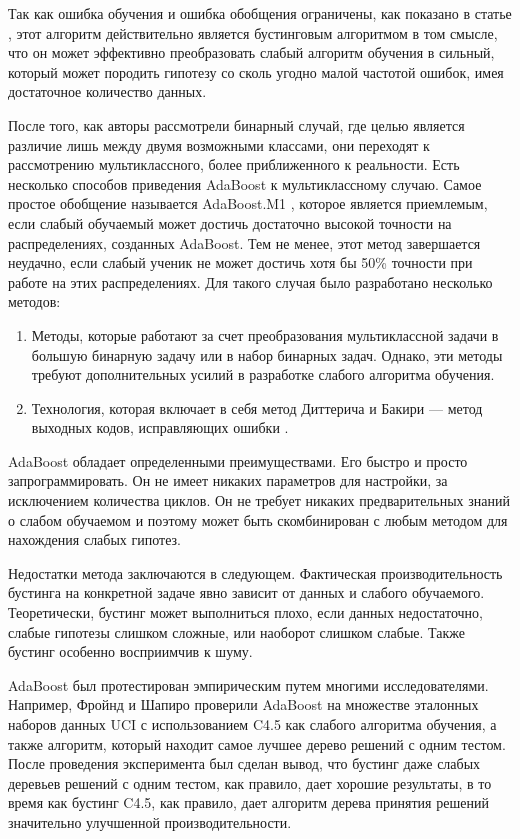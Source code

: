 \documentclass{article}
\begin{document}
\begin{articletext}
Так как ошибка обучения и ошибка обобщения ограничены, как показано в статье \cite{Freund 1999}, этот алгоритм действительно является бустинговым алгоритмом в том смысле, что он может эффективно преобразовать слабый алгоритм обучения в сильный, который может породить гипотезу со сколь угодно малой частотой ошибок, имея достаточное количество данных.

После того, как авторы рассмотрели бинарный случай, где целью является различие лишь между двумя возможными классами, они переходят к рассмотрению мультиклассного, более приближенного к реальности. Есть несколько способов приведения AdaBoost к мультиклассному случаю. Самое простое обобщение называется AdaBoost.M1 \cite{Freund 1997}, которое является приемлемым, если слабый обучаемый может достичь достаточно высокой точности на распределениях, созданных AdaBoost. Тем не менее, этот метод завершается неудачно, если слабый ученик не может достичь хотя бы 50\% точности при работе на этих  распределениях. Для такого случая было разработано несколько методов:

\begin{enumerate}
\item Методы, которые работают за счет преобразования мультиклассной задачи в большую бинарную задачу или в набор бинарных задач. Однако, эти методы требуют дополнительных усилий в разработке слабого алгоритма обучения.
\item Технология, которая включает в себя метод Диттерича и Бакири --- метод выходных кодов, исправляющих ошибки \cite{Schapire 1997}.
\end{enumerate}

AdaBoost обладает определенными преимуществами. Его быстро и просто запрограммировать. Он не имеет никаких параметров для настройки, за исключением количества циклов. Он не требует никаких предварительных знаний о слабом обучаемом и поэтому может быть скомбинирован с любым методом для нахождения слабых гипотез.

Недостатки метода заключаются в следующем. Фактическая производительность бустинга на конкретной задаче явно зависит от данных и слабого обучаемого. Теоретически, бустинг может выполниться плохо, если данных недостаточно, слабые гипотезы слишком сложные, или наоборот слишком слабые. Также бустинг особенно восприимчив к шуму.

AdaBoost был протестирован эмпирическим путем многими исследователями. Например, Фройнд и Шапиро проверили AdaBoost на множестве эталонных наборов данных UCI \cite{Merz 1998} с использованием C4.5 \cite{Quinlan 1993} как слабого алгоритма обучения, а также алгоритм, который находит самое лучшее дерево решений с одним тестом. После проведения эксперимента был сделан вывод, что бустинг даже слабых деревьев решений с одним тестом, как правило, дает хорошие результаты, в то время как бустинг C4.5, как правило, дает алгоритм дерева принятия решений значительно улучшенной производительности.


\end{articletext}
\end{document}
